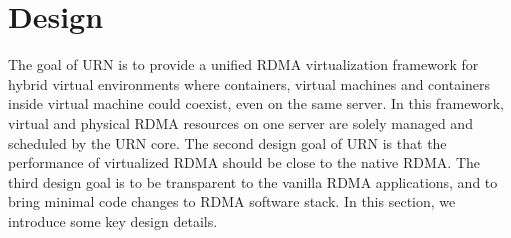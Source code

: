 


\section{Design}
The goal of URN is to provide a unified RDMA virtualization framework for hybrid virtual environments where containers, virtual machines and containers inside virtual machine could coexist, even on the same server. In this framework, virtual and physical RDMA resources on one server are solely managed and scheduled by the URN core. The second design goal of URN is that the performance of virtualized RDMA should be close to the native RDMA. The third design goal is to be transparent to the vanilla RDMA applications, and to bring minimal code changes to RDMA software stack. In this section, we introduce some key design details.


